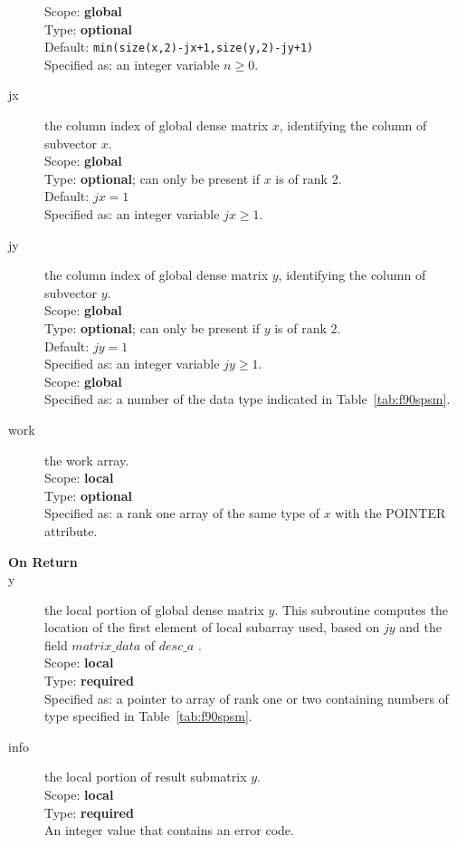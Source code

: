 \begin{description}
Scope: {\bf global} \\
Type: {\bf optional}\\	
Default:  \verb|min(size(x,2)-jx+1,size(y,2)-jy+1)|\\	
Specified as: an integer variable $ n \ge 0$.
\item[jx]  the column index of global dense matrix $x$,
identifying the column of subvector $x$.\\
Scope: {\bf global} \\
Type: {\bf optional}; can only be present if $x$ is of rank 2.\\	
Default: $jx = 1 $\\	
Specified as: an integer variable $jx\ge 1$. 
\item[jy]  the column index of global dense matrix $y$,
identifying the column of subvector $y$.\\
Scope: {\bf global} \\
Type: {\bf optional}; can only be present if $y$ is of rank 2.\\	
Default: $jy = 1 $\\	
Specified as: an integer variable $jy\ge 1$. \\
Scope: {\bf global} \\
Specified as: a number of the data type indicated in Table~\ref{tab:f90spsm}.
\item[work] the work array. \\
Scope: {\bf local} \\
Type: {\bf optional}\\	
Specified as: a rank one array of the same type of $x$ with the
POINTER attribute. 

\item[\bf On Return] 
\item[y] the local portion of global dense matrix
$y$. This subroutine computes the location of the first element of
local subarray used, based on $jy$ and the field $matrix\_data$ of $desc\_a$ . \\
Scope: {\bf local} \\
Type: {\bf required} \\
Specified as: a pointer to array of rank one or two
containing numbers of type specified in
Table~\ref{tab:f90spsm}.
\item[info] the local portion of result submatrix $y$.\\
Scope: {\bf local} \\
Type: {\bf required} \\
An integer value that contains an error code. 
\end{description}




